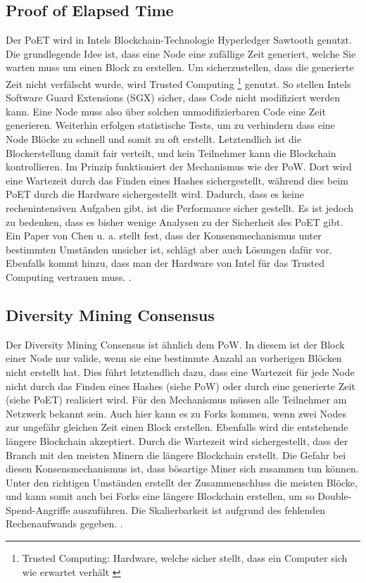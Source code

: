 \subsection{Proof of Elapsed Time}
Der PoET wird in Intels Blockchain-Technologie Hyperledger Sawtooth genutzt. Die grundlegende Idee ist, dass eine Node eine zufällige Zeit generiert, welche Sie warten muss um einen Block zu erstellen. Um sicherzustellen, dass die generierte Zeit nicht verfälscht wurde, wird Trusted Computing \footnote{Trusted Computing: Hardware, welche sicher stellt, dass ein Computer sich wie erwartet verhält \cite{MitchellTrustedComputing2005}} genutzt. So stellen Intels Software Guard Extensions (SGX) sicher, dass Code nicht modifiziert werden kann. Eine Node muss also über solchen unmodifizierbaren Code eine Zeit generieren. Weiterhin erfolgen statistische Tests, um zu verhindern dass eine Node Blöcke zu schnell und somit zu oft erstellt. Letztendlich ist die Blockerstellung damit fair verteilt, und kein Teilnehmer kann die Blockchain kontrollieren. Im Prinzip funktioniert der Mechanismus wie der \acs{PoW}. Dort wird eine Wartezeit durch das Finden eines Hashes sichergestellt, während dies beim PoET durch die Hardware sichergestellt wird. Dadurch, dass es keine rechenintensiven Aufgaben gibt, ist die Performance sicher gestellt. Es ist jedoch zu bedenken, dass es bisher wenige Analysen zu der Sicherheit des PoET gibt. Ein Paper von Chen u. a. stellt fest, dass der Konsensmechanismus unter bestimmten Umständen unsicher ist, schlägt aber auch Lösungen dafür vor. Ebenfalls kommt hinzu, dass man der Hardware von Intel für das Trusted Computing vertrauen muss. \cite{ChenSecurityAnalysisProofofElapsedTime2017}.

\subsection{Diversity Mining Consensus}
Der Diversity Mining Consensus ist ähnlich dem \acs{PoW}. In diesem ist der Block einer Node nur valide, wenn sie eine bestimmte Anzahl an vorherigen Blöcken nicht erstellt hat. Dies führt letztendlich dazu, dass eine Wartezeit für jede Node nicht durch das Finden eines Hashes (siehe \acs{PoW}) oder durch eine generierte Zeit (siehe PoET) realisiert wird. Für den Mechanismus müssen alle Teilnehmer am Netzwerk bekannt sein. Auch hier kann es zu Forks kommen, wenn zwei Nodes zur ungefähr gleichen Zeit einen Block erstellen. Ebenfalls wird die entstehende längere Blockchain akzeptiert. Durch die Wartezeit wird sichergestellt, dass der Branch mit den meisten Minern die längere Blockchain erstellt. Die Gefahr bei diesen Konsensmechanismus ist, dass bösartige Miner sich zusammen tun können. Unter den richtigen Umständen erstellt der Zusammenschluss die meisten Blöcke, und kann somit auch bei Forks eine längere Blockchain erstellen, um so Double-Spend-Angriffe auszuführen. Die Skalierbarkeit ist aufgrund des fehlenden Rechenaufwands gegeben. \cite{GreenspanMultiChainPrivateBlockchain2015}\cite{CachinBlockchainConsensusProtocols2017}.

